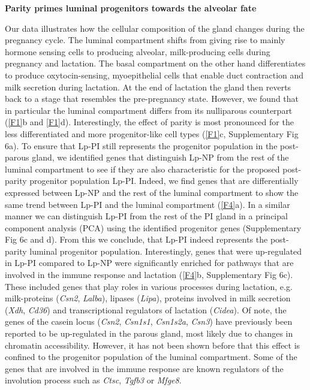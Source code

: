 \documentclass[titlepage, 12pt, oneside]{amsart}
\begin{document}
\textbf{Parity primes luminal progenitors towards the alveolar fate}

Our data illustrates how the cellular composition of the gland changes during the pregnancy cycle.
The luminal compartment shifts from giving rise to mainly hormone sensing cells to producing alveolar, milk-producing cells during pregnancy and lactation. 
The basal compartment on the other hand differentiates to produce oxytocin-sensing, myoepithelial cells that enable duct contraction and milk secretion during lactation.
At the end of lactation the gland then reverts back to a stage that resembles the pre-pregnancy state.
However, we found that in particular the luminal compartment differs from its nulliparous counterpart (\autoref{F1}b and \autoref{F1}d).
Interestingly, the effect of parity is most pronounced for the less differentiated and more progenitor-like cell types (\autoref{F1}c, Supplementary Fig 6a).
To ensure that Lp-PI still represents the progenitor population in the post-parous gland, we identified genes that distinguish Lp-NP from the rest of the luminal compartment to see if they are also characteristic for the proposed post-parity progenitor population Lp-PI.
Indeed, we find genes that are differentially expressed between Lp-NP and the rest of the luminal compartment to show the same trend between Lp-PI and the luminal compartment (\autoref{F4}a).
In a similar manner we can distinguish Lp-PI from the rest of the PI gland in a principal component analysis (PCA) using the identified progenitor genes (Supplementary Fig 6c and d).
From this we conclude, that Lp-PI indeed represents the post-parity luminal progenitor population.
Interestingly, genes that were up-regulated in Lp-PI compared to Lp-NP were significantly enriched for pathways that are involved in the immune response and lactation (\autoref{F4}b, Supplementary Fig 6c).
These included genes that play roles in various processes during lactation, e.g. milk-proteins (\textit{Csn2}, \textit{Lalba}), lipases (\textit{Lipa}), proteins involved in milk secretion (\textit{Xdh}, \textit{Cd36}) and transcriptional regulators of lactation (\textit{Cidea}).
Of note, the genes of the casein locus (\textit{Csn2}, \textit{Csn1s1}, \textit{Csn1s2a}, \textit{Csn3}) have previously been reported to be up-regulated in the parous gland, most likely due to changes in chromatin accessibility\autocite{Dos2015,Rijnkels2013}.
However, it has not been shown before that this effect is confined to the progenitor population of the luminal compartment.
Some of the genes that are involved in the immune response are known regulators of the involution process such as \textit{Ctsc}, \textit{Tgfb3} or \textit{Mfge8}.
\end{document}
